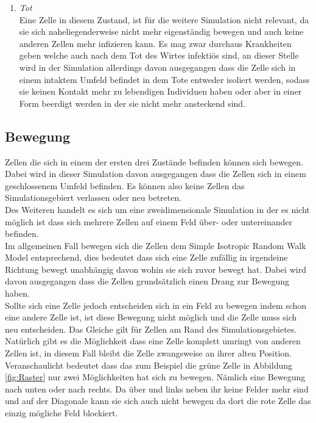 \begin{enumerate}
\item{\emph{Tot}\\
Eine Zelle in diesem Zustand, ist für die weitere Simulation nicht relevant, da sie sich naheliegenderweise nicht mehr eigenständig bewegen und auch keine anderen Zellen mehr infizieren kann. Es mag zwar durchaus Krankheiten geben welche auch nach dem Tot des Wirtes infektiös sind, an dieser Stelle wird in der Simulation allerdings davon ausgegangen dass die Zelle sich in einem \glqq{}intaktem\grqq{} Umfeld befindet in dem Tote entweder isoliert werden, sodass sie keinen Kontakt mehr zu lebendigen Individuen haben oder aber in einer Form beerdigt werden in der sie nicht mehr ansteckend sind. 
}
\end{enumerate}

\subsection*{Bewegung}
Zellen die sich in einem der ersten drei Zustände befinden können sich bewegen. Dabei wird in dieser Simulation davon ausgegangen dass die Zellen sich in einem geschlossenem Umfeld befinden. Es können also keine Zellen das Simulationsgebiert verlassen oder neu betreten.\\
Des Weiteren handelt es sich um eine zweidimensionale Simulation in der es nicht möglich ist dass sich mehrere Zellen auf einem Feld über- oder untereinander befinden.\\
Im allgemeinen Fall bewegen sich die Zellen dem Simple Isotropic  Random Walk Model \cite{Codling:2008} entsprechend, dies bedeutet dass sich eine Zelle zufällig in irgendeine Richtung bewegt unabhängig davon wohin sie sich zuvor bewegt hat. Dabei wird davon ausgegangen dass die Zellen grundsätzlich einen Drang zur Bewegung haben.\\
Sollte sich eine Zelle jedoch entscheiden sich in ein Feld zu bewegen indem schon eine andere Zelle ist, ist diese Bewegung nicht möglich und die Zelle muss sich neu entscheiden. Das Gleiche gilt für Zellen am Rand des Simulationsgebietes. Natürlich gibt es die Möglichkeit dass eine Zelle komplett \glqq umringt\grqq\; von anderen Zellen ist, in diesem Fall bleibt die Zelle zwangsweise an ihrer alten Position.\\
Veranschaulicht bedeutet dass das zum Beispiel die grüne Zelle in Abbildung \ref{fig:Raster} nur zwei Möglichkeiten hat sich zu bewegen. Nämlich eine Bewegung nach unten oder nach rechts. Da über und links neben ihr keine Felder mehr sind und auf der Diagonale kann sie sich auch nicht bewegen da dort die rote Zelle das einzig mögliche Feld blockiert.\\
